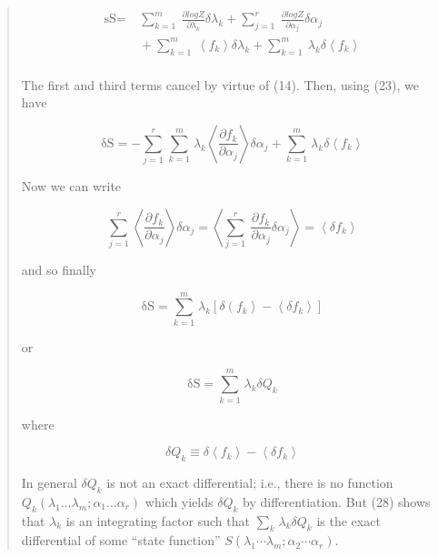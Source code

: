 \documentclass[]{article}
\begin{document}
\begin{quote}
\[\begin{matrix}
\text{sS} = & \ \sum_{k = 1}^{m}\mspace{2mu}\mspace{2mu}\frac{\partial logZ}{\partial\lambda_{k}}\delta\lambda_{k} + \sum_{j = 1}^{r}\mspace{2mu}\mspace{2mu}\frac{\partial logZ}{\partial\alpha_{j}}\delta\alpha_{j} \\
 & \  + \sum_{k = 1}^{m}\mspace{2mu}\mspace{2mu}\left\langle f_{k} \right\rangle\delta\lambda_{k} + \sum_{k = 1}^{m}\mspace{2mu}\mspace{2mu}\lambda_{k}\delta\left\langle f_{k} \right\rangle \\
\end{matrix}\]

The first and third terms cancel by virtue of (14). Then, using (23), we
have

\[\text{δS} = - \sum_{j = 1}^{r}\mspace{2mu}\sum_{k = 1}^{m}\mspace{2mu}\lambda_{k}\left\langle \frac{\partial f_{k}}{\partial\alpha_{j}} \right\rangle\delta\alpha_{j} + \sum_{k = 1}^{m}\mspace{2mu}\lambda_{k}\delta\left\langle f_{k} \right\rangle\]

Now we can write

\[\sum_{j = 1}^{r}\mspace{2mu}\left\langle \frac{\partial f_{k}}{\partial\alpha_{j}} \right\rangle\delta\alpha_{j} = \left\langle \sum_{j = 1}^{r}\mspace{2mu}\mspace{2mu}\frac{\partial f_{k}}{\partial\alpha_{j}}\delta\alpha_{j} \right\rangle = \left\langle \delta f_{k} \right\rangle\]

and so finally

\[\text{δS} = \sum_{k = 1}^{m}\mspace{2mu}\lambda_{k}\left\lbrack \delta\left( f_{k} \right\rangle - \left\langle \delta f_{k} \right\rangle \right\rbrack\]

or

\[\text{δS} = \sum_{k = 1}^{m}\mspace{2mu}\lambda_{k}\delta Q_{k}\]

where

\[\delta Q_{k} \equiv \delta\left\langle f_{k} \right\rangle - \left\langle \delta f_{k} \right\rangle\]

In general \(\delta Q_{k}\) is not an exact differential; i.e., there is
no function
\(Q_{k}\left( \lambda_{1}\ldots\lambda_{m};\alpha_{1}\ldots\alpha_{r} \right)\)
which yields \(\delta Q_{k}\) by differentiation. But (28) shows that
\(\lambda_{k}\) is an integrating factor such that
\(\sum_{k}\mspace{2mu}\lambda_{k}\delta Q_{k}\) is the exact
differential of some ``state function''
\(S\left( \lambda_{1}\cdots\lambda_{m};\alpha_{2}\cdots\alpha_{r} \right)\).


\end{quote}
\end{document}
